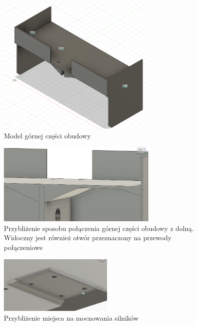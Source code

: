 \begin{figure}[H]
  \centering
  \includegraphics[width=0.7\textwidth]{./graf/upper.png}
  \caption{Model górnej części obudowy}
  \label{fig:ball-close}
\end{figure}

\begin{figure}[H]
  \centering
  \includegraphics[width=0.7\textwidth]{./graf/full-close.png}
  \caption{Przybliżenie sposobu połączenia górnej części obudowy z dolną. Widoczny jest również otwór przeznaczony na przewody połączeniowe}
  \label{fig:full-close}
\end{figure}


\begin{figure}[H]
  \centering
  \includegraphics[width=0.5\textwidth]{./graf/motor-close.png}
  \caption{Przybliżenie miejsca na mocnowania silników}
  \label{fig:base-close}
\end{figure}

